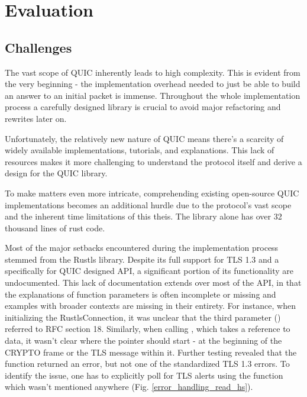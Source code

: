 \chapter{Evaluation}


\section{Challenges}
The vast scope of QUIC inherently leads to high complexity. This is evident from the very beginning - 
the implementation overhead needed to just be able to build an answer to an initial packet is immense.
Throughout the whole implementation process a carefully designed library is crucial to avoid major refactoring and
rewrites later on.

Unfortunately, the relatively new nature of QUIC means there's a scarcity of widely available implementations, tutorials,
and explanations.  This lack of resources makes it more challenging to understand the protocol itself and derive a design
for the QUIC library.

To make matters even more intricate, comprehending existing open-source QUIC implementations becomes an additional hurdle due
to the protocol's vast scope and the inherent time limitations of this theis. The  library alone has over
32 thousand lines of rust code.

Most of the major setbacks encountered during the implementation process stemmed from the Rustls library. Despite its full support for 
TLS 1.3 and a specifically for QUIC designed API, a significant portion of its functionality are undocumented. This lack of documentation
extends over most of the API, in that the explanations of function parameters is often incomplete or missing and examples with
broader contexts are missing in their entirety.
For instance, when initializing the RustlsConnection, it was unclear that the third parameter () referred to
RFC section 18. Similarly, when calling , which takes a reference to data, it wasn't clear where the
pointer should start - at the beginning of the CRYPTO frame or the TLS message within it. Further testing revealed that
the function returned an error, but not one of the standardized TLS 1.3 errors. To identify the issue, one has to explicitly
poll for TLS alerts using the  function which wasn't mentioned anywhere (Fig. \ref{error_handling_read_hs}).

